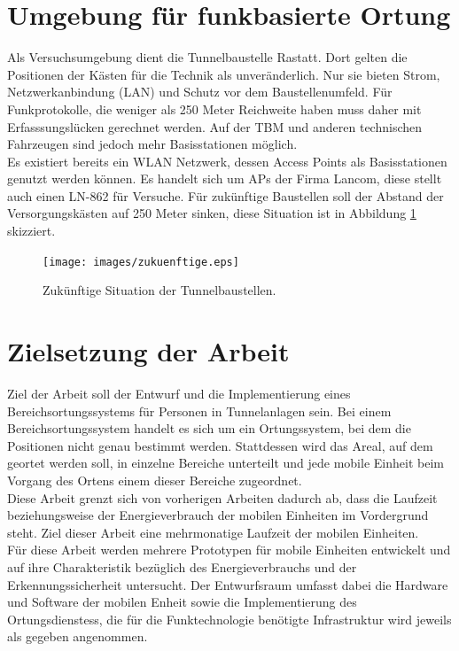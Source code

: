 \section{Umgebung für funkbasierte Ortung}
Als Versuchsumgebung dient die Tunnelbaustelle Rastatt.
Dort gelten die Positionen der Kästen für die Technik als unveränderlich.
Nur sie bieten Strom, Netzwerkanbindung (LAN) und Schutz vor dem Baustellenumfeld.
Für Funkprotokolle, die weniger als 250 Meter Reichweite haben muss daher mit Erfasssungslücken gerechnet werden.
Auf der TBM und anderen technischen Fahrzeugen sind jedoch mehr Basisstationen möglich.\\
Es existiert bereits ein WLAN Netzwerk, dessen Access Points als Basisstationen genutzt werden können.
Es handelt sich um APs der Firma Lancom, diese stellt auch einen LN-862 für Versuche.
Für zukünftige Baustellen soll der Abstand der Versorgungskästen auf 250 Meter sinken, diese Situation ist in Abbildung \ref{fig:zukuenftige} skizziert.

\begin{figure}[h]
  \centering
	\texttt{[image: images/zukuenftige.eps]}
  \caption{Zukünftige Situation der Tunnelbaustellen.}
  \label{fig:zukuenftige}
\end{figure}

\section{Zielsetzung der Arbeit}
\label{ch:Einleitung:sec:Zielsetzung}
Ziel der Arbeit soll der Entwurf und die Implementierung eines Bereichsortungssystems für Personen in Tunnelanlagen sein. 
Bei einem Bereichsortungssystem handelt es sich um ein Ortungssystem, bei dem die Positionen nicht genau bestimmt werden. 
Stattdessen wird das Areal, auf dem geortet werden soll, in einzelne Bereiche unterteilt und jede mobile Einheit beim Vorgang des Ortens einem dieser Bereiche zugeordnet.\\
Diese Arbeit grenzt sich von vorherigen Arbeiten dadurch ab, dass die Laufzeit beziehungsweise der Energieverbrauch der mobilen Einheiten im Vordergrund steht. 
Ziel dieser Arbeit eine mehrmonatige Laufzeit der mobilen Einheiten. \\
Für diese Arbeit werden mehrere Prototypen für mobile Einheiten entwickelt und auf ihre Charakteristik bezüglich des Energieverbrauchs und der Erkennungssicherheit untersucht.
Der Entwurfsraum umfasst dabei die Hardware und Software der mobilen Enheit sowie die Implementierung des Ortungsdienstess, die für die Funktechnologie benötigte Infrastruktur wird jeweils als gegeben angenommen.


